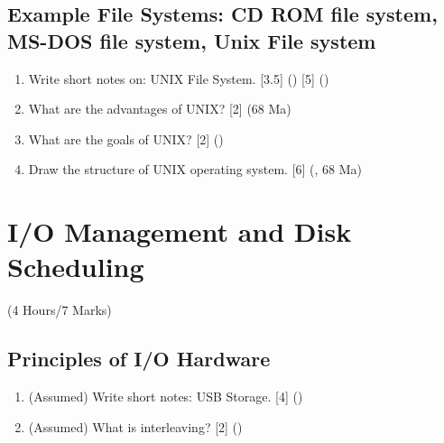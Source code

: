 \documentclass[12pt]{article}
\begin{document}
	\subsection{Example File Systems: CD ROM file system, MS-DOS file system, Unix File system}
		\begin{enumerate}[noitemsep, topsep=0pt]
			\item Write short notes on: UNIX File System. \hfill [3.5] () [5] ()

			\item What are the advantages of UNIX? \hfill [2] (68 Ma)

			\item What are the goals of UNIX? \hfill [2] ()

			\item Draw the structure of UNIX operating system. \hfill [6] (, 68 Ma)
		\end{enumerate}

	\pagebreak

\section{I/O Management and Disk Scheduling}
	\begin{center}(4 Hours/7 Marks)\end{center}
	\subsection{Principles of I/O Hardware}
		\begin{enumerate}[noitemsep, topsep=0pt]
			\item (Assumed) Write short notes: USB Storage. \hfill [4] ()

			\item (Assumed) What is interleaving? \hfill [2] ()
		\end{enumerate}
\end{document}
